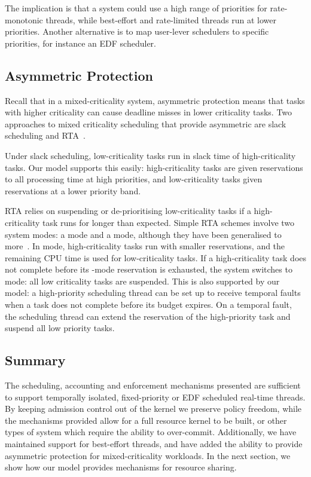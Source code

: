 The implication is that a system could use a high range of priorities for rate-monotonic threads,
while best-effort and rate-limited threads run at lower priorities.  Another alternative is to map
user-lever schedulers to specific  priorities, for instance an EDF scheduler. 

\subsection{Asymmetric Protection}

Recall that in a mixed-criticality system, asymmetric protection means that tasks with higher
criticality can cause deadline misses in lower criticality tasks.  Two approaches to mixed
criticality scheduling that provide asymmetric are slack scheduling and
\gls{RTA}~\citep{Burns_Davis_17}.

Under slack scheduling, low-criticality tasks run in slack time of high-criticality tasks.  Our
model supports this easily: high-criticality tasks are given reservations to all processing time at
high priorities, and low-criticality tasks given reservations at a lower priority band.

\gls{RTA} relies on suspending or de-prioritising low-criticality tasks if a high-criticality
task runs for longer than expected.  Simple \gls{RTA} schemes involve two system modes:
a  mode and a  mode, although they have been generalised to
more~\citep{Fleming_Burns_13}.  In  mode, high-criticality tasks run with smaller 
reservations, and the remaining
CPU time is used for low-criticality tasks.  If a high-criticality task does not complete before its
-mode reservation is exhausted, the system switches to  mode: all low criticality
tasks are suspended.  This is also supported by our model: a high-priority scheduling thread can be
set up to receive temporal faults when a task does not complete before its budget expires.  On a
temporal fault, the scheduling thread can extend the reservation of the high-priority task and
suspend all low priority tasks.

\subsection{Summary}

The scheduling, accounting and enforcement mechanisms presented are sufficient to support temporally
isolated, fixed-priority or \gls{EDF} scheduled real-time threads. By keeping admission control
out of the kernel we preserve policy freedom, while the mechanisms provided allow for a full
resource kernel to be built, or other types of system which require the ability to over-commit.
Additionally, we have maintained
support for best-effort threads, and have added the ability to provide asymmetric protection for
mixed-criticality workloads. 
In the next section, we show how our model provides mechanisms for resource sharing. 

